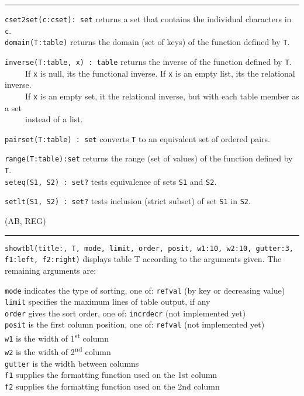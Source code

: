 \vspace{0.25cm}\hrule{}

\texttt{cset2set(c:cset): set} returns a set that contains the
individual characters in \texttt{c}.\\
\texttt{domain(T:table)} returns the domain (set of keys) of the
function defined by \texttt{T}.

\texttt{inverse(T:table, x) : table} returns the inverse of the function
defined by \texttt{T}.\\
 \ \ \ \ \ If \texttt{x} is null, it{\textquotesingle}s the functional
inverse. If \texttt{x} is an empty list, it{\textquotesingle}s the
relational inverse.\\
 \ \ \ \ \ If \texttt{x} is an empty set, it the relational inverse, but
with each table member as a set\\
 \ \ \ \ \ instead of a list.

\texttt{pairset(T:table) : set} converts \texttt{T} to an equivalent set
of ordered pairs.

\texttt{range(T:table):set} returns the range (set of values) of the
function defined by \texttt{T}.\\
\texttt{seteq(S1, S2) : set?} tests equivalence
of sets \texttt{S1} and \texttt{S2}.

\texttt{setlt(S1, S2) : set?} tests inclusion (strict subset) of set
\texttt{S1} in \texttt{S2}. 

(AB, REG)

\vspace{0.25cm}\hrule{}

\texttt{showtbl(title:{\textquotedbl}{\textquotedbl}, T, mode, limit,
order, posit, w1:10, w2:10, gutter:3, f1:left, f2:right)} displays
table T according to the arguments given. The remaining arguments are:

\texttt{mode} indicates the type of sorting, one of:
\texttt{{\textquotedbl}ref{\textquotedbl}{\textbar}{\textquotedbl}val{\textquotedbl}}
(by key or decreasing value)\\
\texttt{limit} specifies the maximum lines of table output, if
any\\
\texttt{order} gives the sort order, one of:
\texttt{{\textquotedbl}incr{\textquotedbl}{\textbar}{\textquotedbl}decr{\textquotedbl}}
(not implemented yet)\\
\texttt{posit} is the first column position, one of:
\texttt{{\textquotedbl}ref{\textquotedbl}{\textbar}{\textquotedbl}val{\textquotedbl}}
(not implemented yet)\\
\texttt{w1} is the width of 1\textsuperscript{st} column\\
\texttt{w2} is the width of 2\textsuperscript{nd} column\\
\texttt{gutter} is the width between columns\\
\texttt{f1} supplies the formatting function used on the 1st
column\\
\texttt{f2} supplies the formatting function used on the 2nd column

